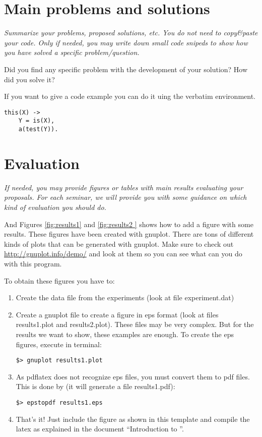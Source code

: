 \documentclass[a4paper, 11pt]{article}
\begin{document}
\section{Main problems and solutions}

\textit{Summarize your problems, proposed solutions, etc. You do not
  need to copy\&paste your code. Only if needed, you may write down
  small code snipeds to show how you have solved a specific
  problem/question.}

Did you find any specific problem with the development of your
solution?  How did you solve it?

If you want to give a code example you can do it uing the verbatim environment.
\begin{verbatim}
this(X) ->
    Y = is(X),
    a(test(Y)).
\end{verbatim}

\section{Evaluation}

\textit{If needed, you may provide figures or tables with main results
  evaluating your proposals. For each seminar, we will provide you
  with some guidance on which kind of evaluation you should do.}


And Figures \ref{fig:results1} and \ref{fig:results2 } shows how to
add a figure with some results. These figures have been created with
gnuplot. There are tons of different kinds of plots that can be
generated with gnuplot. Make sure to check out
\url{http://gnuplot.info/demo/} and look at them so you can see what
can you do with this program.


To obtain these figures you have to:
\begin{enumerate}

\item Create the data file from the experiments (look at file
  experiment.dat)

\item Create a gnuplot file to create a figure in eps format (look at
  files results1.plot and results2.plot). These files may be very
  complex. But for the results we want to show, these examples are
  enough. To create the eps figures, execute in terminal:

\begin{verbatim}
$> gnuplot results1.plot 
\end{verbatim}

\item As pdflatex does not recognize eps files, you must convert them
  to pdf files. This is done by (it will generate a file
  results1.pdf):

\begin{verbatim}
$> epstopdf results1.eps
\end{verbatim}

\item That's it! Just include the figure as shown in this template and
  compile the latex as explained in the document ``Introduction to
  \LaTeXe''.

\end{enumerate}
\end{document}

